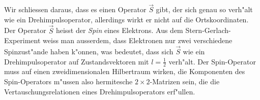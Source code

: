 
Wir schliessen daraus, dass es einen Operator $\vec S$ gibt, der sich
genau so verh"alt wie ein Drehimpulsoperator, allerdings wirkt er nicht
auf die Ortskoordinaten.
Der Operator $\vec S$ heisst der {\em Spin} eines Elektrons.
%
%
Aus dem Stern-Gerlach-Experiment
weiss man ausserdem, dass Elektronen nur zwei verschiedene
Spinzust"ande haben k"onnen, was bedeutet, dass sich $\vec S$ wie ein
Drehimpulsoperator auf Zustandsvektoren mit $l=\frac12$ verh"alt.
Der Spin-Operator muss auf einen zweidimensionalen Hilbertraum
wirken, die Komponenten des Spin-Operators m"ussen also hermitesche
$2\times 2$-Matrizen sein, die die Vertauschungsrelationen eines
Drehimpulsoperators erf"ullen.

